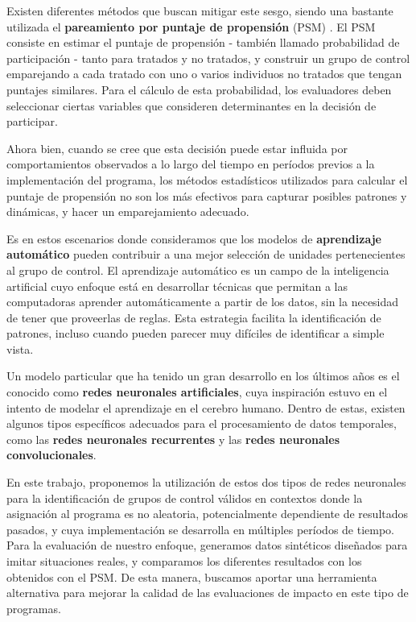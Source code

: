 \documentclass[../main.tex]{subfiles}
\begin{document}
Existen diferentes métodos que buscan mitigar este sesgo, siendo una bastante utilizada
el \textbf{pareamiento por puntaje de propensión} (PSM) \cite{psm1983}. El PSM consiste en
estimar el puntaje de propensión - también llamado probabilidad de participación - tanto
para tratados y no tratados, y construir un grupo de control emparejando a cada tratado
con uno o varios individuos no tratados que tengan puntajes similares. Para el cálculo de
esta probabilidad, los evaluadores deben seleccionar ciertas variables que consideren
determinantes en la decisión de participar.

Ahora bien, cuando se cree que esta decisión puede estar influida por comportamientos
observados a lo largo del tiempo en períodos previos a la implementación del programa, los
métodos estadísticos utilizados para calcular el puntaje de propensión no son los más
efectivos para capturar posibles patrones y dinámicas, y hacer un emparejamiento adecuado.

Es en estos escenarios donde consideramos que los modelos de \textbf{aprendizaje
automático} pueden contribuir a una mejor selección de unidades pertenecientes al grupo de
control. El aprendizaje automático es un campo de la inteligencia artificial cuyo enfoque
está en desarrollar técnicas que permitan a las computadoras aprender automáticamente a
partir de los datos, sin la necesidad de tener que proveerlas de reglas. Esta estrategia
facilita la identificación de patrones, incluso cuando pueden parecer muy difíciles de
identificar a simple vista.

Un modelo particular que ha tenido un gran desarrollo en los últimos años es el conocido
como \textbf{redes neuronales artificiales}, cuya inspiración estuvo en el intento de
modelar el aprendizaje en el cerebro humano. Dentro de estas, existen algunos tipos
específicos adecuados para el procesamiento de datos temporales, como las \textbf{redes
neuronales recurrentes} y las \textbf{redes neuronales convolucionales}.

En este trabajo, proponemos la utilización de estos dos tipos de redes neuronales para la
identificación de grupos de control válidos en contextos donde la asignación al programa
es no aleatoria, potencialmente dependiente de resultados pasados, y cuya implementación
se desarrolla en múltiples períodos de tiempo. Para la evaluación de nuestro enfoque,
generamos datos sintéticos diseñados para imitar situaciones reales, y comparamos los
diferentes resultados con los obtenidos con el PSM. De esta manera, buscamos aportar una
herramienta alternativa para mejorar la calidad de las evaluaciones de impacto en este
tipo de programas.
\end{document}
